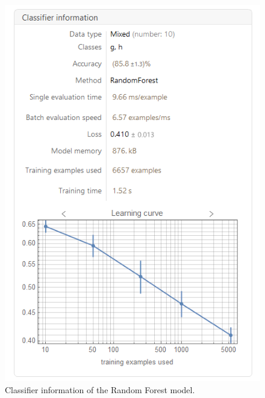 \documentclass[a4paper, 12pt]{report}
\theoremstyle{definition}
\begin{document}
\begin{figure}[p]
  \centering
  \includegraphics[scale=0.75]{models/rf1.png}
  \caption{Classifier information of the Random Forest model.}
\end{figure}
\end{document}
